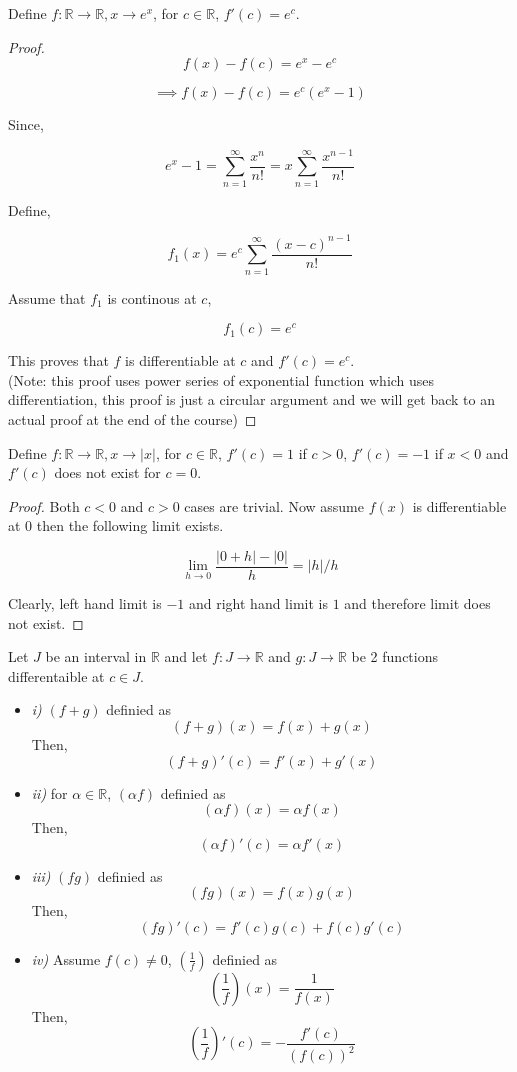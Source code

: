 \documentclass[11pt,a4paper]{colorart}
\def\l{\left}
\def\r{\right}
\def\R{\mathbb{R}}
\def\a{\alpha}
\def\ra{\rightarrow}
\begin{document}
\begin{example}
	Define $f: \R \ra \R, x \ra e^x$, for $c \in \R$, $f'(c) = e^c$.
\end{example}
	
\begin{proof}
	
	\[ f(x) - f(c) = e^x - e^c \]

	\[ \implies f(x) - f(c) = e^c \l( e^x - 1 \r) \]

	Since, 
	
	\[ e^x -1 = \sum_{n=1}^{\infty} \frac{ x^n }{ n! } = x \sum_{n=1}^{\infty} \frac{ x^{n-1} }{ n! } \]

	Define,

	\[ f_1(x) = e^c \sum_{n=1}^{\infty} \frac{ (x-c)^{n-1} }{ n! } \]

	Assume that $f_1$ is continous at $c$,

	\[ f_1(c) = e^c \]

	This proves that $f$ is differentiable at $c$ and $f'(c) = e^c$.\\

	(Note: this proof uses power series of exponential function which uses differentiation, this proof is just a circular argument and we will get back to an actual proof at the end of the course)

\end{proof}

\begin{example}
	Define $f: \R \ra \R, x \ra |x|$, for $c \in \R$, $f'(c) = 1$ if $c>0$, $f'(c) = -1$ if $x<0$ and $f'(c)$ does not exist for $c=0$.
\end{example}

\begin{proof}
	Both $c<0$ and $c>0$ cases are trivial. Now assume $f(x)$ is differentiable at 0 then the following limit exists.
	
	\[ \lim_{ h \to 0 } \frac{ |0+h| -|0| }{ h } = |h|/h \]
	
	Clearly, left hand limit is $-1$ and right hand limit is $1$ and therefore limit does not exist.

\end{proof}

\begin{theorem}
	Let $J$ be an interval in $\R$ and let $f:J \ra \R$ and $g:J \ra \R$ be 2 functions differentaible at $c\in J$.
	\begin{itemize}
		\item \textit{i)} $(f+g)$ definied as 
			\[ (f+g)(x) = f(x) + g(x) \] 
			Then,
			\[ (f+g)'(c) = f'(x) + g'(x) \]
		\item \textit{ii)} for $\a \in \R$, $(\a f)$ definied as 
			\[ (\a f)(x)=\a f(x) \]
			Then,
			\[ (\a f)'(c)=\a f'(x) \]
		\item \textit{iii)} $(fg)$ definied as 
			\[ (fg)(x)=f(x)g(x)\] 
			Then,
			\[ (fg)'(c)=f'(c)g(c)+f(c)g'(c) \]
		\item \textit{iv)} Assume $f(c)\neq 0$, $(\frac{1}{f})$ definied as 
			\[ \l(\frac{1}{f}\r)(x) = \frac{1}{f(x)} \]
			Then,
			\[ \l(\frac{1}{f}\r)'(c) = -\frac{f'(c)}{(f(c))^2} \]
	\end{itemize}
\end{theorem}
\end{document}
